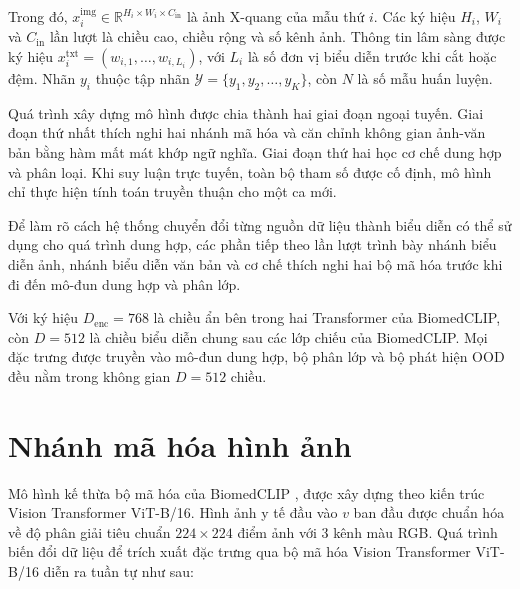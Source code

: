 Trong đó, $x_i^{\mathrm{img}}\in\mathbb{R}^{H_i\times W_i\times C_{\mathrm{in}}}$ là ảnh X-quang của mẫu thứ $i$. Các ký hiệu $H_i$, $W_i$ và $C_{\mathrm{in}}$ lần lượt là chiều cao, chiều rộng và số kênh ảnh. Thông tin lâm sàng được ký hiệu $x_i^{\mathrm{txt}}=\left(w_{i,1},\ldots,w_{i,L_i}\right)$, với $L_i$ là số đơn vị biểu diễn trước khi cắt hoặc đệm. Nhãn $y_i$ thuộc tập nhãn $\mathcal{Y}=\{y_1,y_2,\ldots,y_K\}$, còn $N$ là số mẫu huấn luyện.

Quá trình xây dựng mô hình được chia thành hai giai đoạn ngoại tuyến. Giai đoạn thứ nhất thích nghi hai nhánh mã hóa và căn chỉnh không gian ảnh-văn bản bằng hàm mất mát khớp ngữ nghĩa. Giai đoạn thứ hai học cơ chế dung hợp và phân loại. Khi suy luận trực tuyến, toàn bộ tham số được cố định, mô hình chỉ thực hiện tính toán truyền thuận cho một ca mới.

Để làm rõ cách hệ thống chuyển đổi từng nguồn dữ liệu thành biểu diễn có thể sử dụng cho quá trình dung hợp, các phần tiếp theo lần lượt trình bày nhánh biểu diễn ảnh, nhánh biểu diễn văn bản và cơ chế thích nghi hai bộ mã hóa trước khi đi đến mô-đun dung hợp và phân lớp.

Với ký hiệu $D_{\mathrm{enc}}=768$ là chiều ẩn bên trong hai Transformer của BiomedCLIP, còn $D=512$ là chiều biểu diễn chung sau các lớp chiếu của BiomedCLIP. Mọi đặc trưng được truyền vào mô-đun dung hợp, bộ phân lớp và bộ phát hiện OOD đều nằm trong không gian $D=512$ chiều.

\section{Nhánh mã hóa hình ảnh}

Mô hình kế thừa bộ mã hóa của BiomedCLIP \cite{BiomedCLIP}, được xây dựng theo kiến trúc Vision Transformer \cite{Dosovitskiy2021ViT} ViT-B/16. Hình ảnh y tế đầu vào $v$ ban đầu được chuẩn hóa về độ phân giải tiêu chuẩn $224 \times 224$ điểm ảnh với $3$ kênh màu RGB. Quá trình biến đổi dữ liệu để trích xuất đặc trưng qua bộ mã hóa Vision Transformer ViT-B/16 diễn ra tuần tự như sau:

